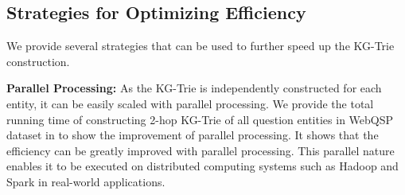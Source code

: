 {    \begin{table}[]
        \centering
        \caption{Breakdown of the time consumption for each component involved in the KG-Trie construction.}
        \label{tab:breakdown}
        \end{table}

    \subsection{Strategies for Optimizing Efficiency}
    We provide several strategies that can be used to further speed up the KG-Trie construction.

    \noindent\textbf{Parallel Processing:} As the KG-Trie is independently constructed for each entity, it can be easily scaled with parallel processing. We provide the total running time of constructing 2-hop KG-Trie of all question entities in WebQSP dataset in  to show the improvement of parallel processing. It shows that the efficiency can be greatly improved with parallel processing. This parallel nature enables it to be executed on distributed computing systems such as Hadoop and Spark in real-world applications.

}
